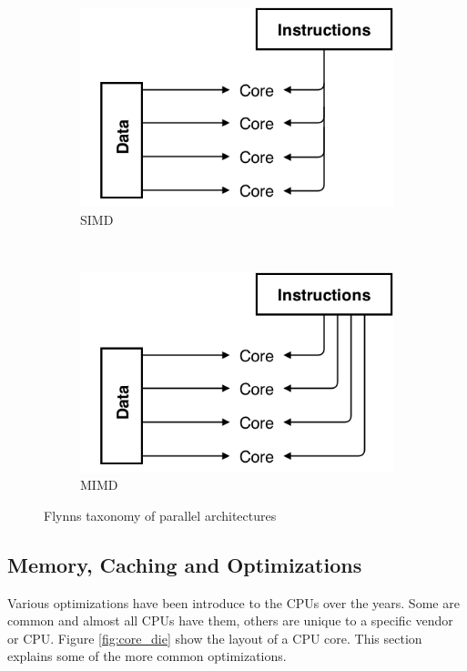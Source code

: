 \documentclass[10pt,a4paper]{report}
\begin{document}
\begin{figure}
        \begin{subfigure}[b]{0.48\textwidth}
                \includegraphics[width=\textwidth]{SIMD}
                \caption{SIMD}
                \label{fig:SIMD}
        \end{subfigure}
        ~
        \begin{subfigure}[b]{0.48\textwidth}
                \includegraphics[width=\textwidth]{MIMD}
                \caption{MIMD}
                \label{fig:MIMD}
        \end{subfigure}
        \caption{Flynns taxonomy of parallel architectures\cite{introduction_hpc_hager}}\label{fig:flynn_taxonomy}
\end{figure}

\subsection{Memory, Caching and Optimizations}
\label{optimizations}
Various optimizations have been introduce to the CPUs over the years\cite{drepper2007cpumemory, introduction_hpc_hager}. Some are common and almost all CPUs have them, others are unique to a specific vendor or CPU\cite{introduction_hpc_hager}. Figure \ref{fig:core_die} show the layout of a CPU core. This section explains some of the more common optimizations.
\end{document}
